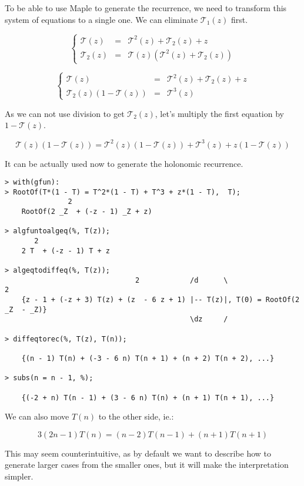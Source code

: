 \documentclass[final]{article}
\theoremstyle{definition}
\theoremstyle{remark}
\newcommand{\gf}[1]{\ensuremath{\mathcal{#1}}}
\begin{document}
To be able to use Maple to generate the recurrence, we need to transform this system of equations to a single one. We can eliminate \(\gf{T}_1(z)\) first.

\[\left\{\begin{array}{rcl}
            \gf{T}(z) &=& \gf{T}^2(z) + \gf{T}_2(z) + z\\
            \gf{T}_2(z) &=& \gf{T}(z)(\gf{T}^2(z) + \gf{T}_2(z))
\end{array}\right.\]

\[\left\{\begin{array}{rcl}
            \gf{T}(z) &=& \gf{T}^2(z) + \gf{T}_2(z) + z\\
            \gf{T}_2(z)(1 - \gf{T}(z)) &=& \gf{T}^3(z)
\end{array}\right.\]

As we can not use division to get \(\gf{T}_2(z)\), let's multiply the first equation by \(1 - \gf{T}(z)\).

\[\gf{T}(z)(1 - \gf{T}(z)) = \gf{T}^2(z)(1 - \gf{T}(z)) + \gf{T}^3(z) + z(1 - \gf{T}(z))\]

It can be actually used now to generate the holonomic recurrence.

\begin{lstlisting}
> with(gfun):
> RootOf(T*(1 - T) = T^2*(1 - T) + T^3 + z*(1 - T),  T);
               2
    RootOf(2 _Z  + (-z - 1) _Z + z)

> algfuntoalgeq(%, T(z));
       2
    2 T  + (-z - 1) T + z

> algeqtodiffeq(%, T(z));
                               2            /d      \                    2
    {z - 1 + (-z + 3) T(z) + (z  - 6 z + 1) |-- T(z)|, T(0) = RootOf(2 _Z  - _Z)}
                                            \dz     /

> diffeqtorec(%, T(z), T(n));

    {(n - 1) T(n) + (-3 - 6 n) T(n + 1) + (n + 2) T(n + 2), ...}

> subs(n = n - 1, %);

    {(-2 + n) T(n - 1) + (3 - 6 n) T(n) + (n + 1) T(n + 1), ...}
\end{lstlisting}

We can also move \(T(n)\) to the other side, ie.:

\[3 (2 n - 1) T(n) = (n - 2) T(n - 1) + (n + 1) T(n + 1)\]

This may seem counterintuitive, as by default we want to describe how to generate larger cases from the smaller ones, but it will make the interpretation simpler.
\end{document}
